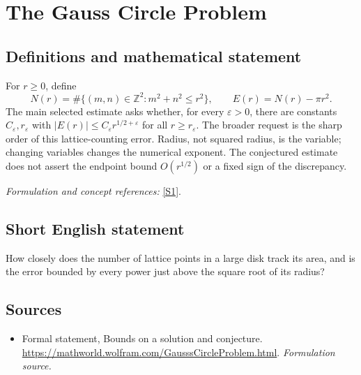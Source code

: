 \documentclass[11pt]{article}
\begin{document}
\section*{\texorpdfstring{The Gauss Circle Problem}{The Gauss Circle Problem}}\label{1159}
\subsection{Definitions and mathematical statement}
For $r\ge0$, define
\[
 N(r)=\#\{(m,n)\in{\mathbb{Z}}^2:m^2+n^2\le r^2\},\qquad E(r)=N(r)-\pi r^2.
\]
The main selected estimate asks whether, for every ${\varepsilon}>0$, there are constants $C_{\varepsilon},r_{\varepsilon}$ with
$|E(r)|\le C_{\varepsilon} r^{1/2+{\varepsilon}}$ for all $r\ge r_{\varepsilon}$.
The broader request is the sharp order of this lattice-counting error. Radius, not squared radius, is the variable; changing variables changes the numerical exponent. The conjectured estimate does not assert the endpoint bound $O(r^{1/2})$ or a fixed sign of the discrepancy.
\par\smallskip\textit{Formulation and concept references:} \href{https://mathworld.wolfram.com/GausssCircleProblem.html}{[S1]}.

\subsection{Short English statement}
How closely does the number of lattice points in a large disk track its area, and is the error bounded by every power just above the square root of its radius?
\subsection{Sources}
\begin{itemize}
\item[S1]Formal statement, Bounds on a solution and conjecture.
\url{https://mathworld.wolfram.com/GausssCircleProblem.html}.
\textit{Formulation source.}
\end{itemize}
\end{document}
